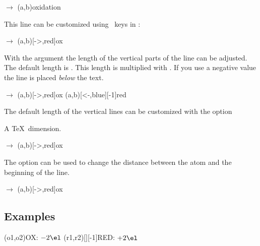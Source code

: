 \documentclass{chemmacros-manual}
\begin{document}
\begin{example}
  \vspace{7mm}
   $\rightarrow$ \pch\redox(a,b){oxidation}
\end{example}

This line can be customized using \TikZ\ keys in :
\begin{example}
  \vspace{7mm}
   $\rightarrow$ \pch\redox(a,b)[->,red]{ox}
\end{example}

With the argument  the length of the vertical parts of the line can
be adjusted.  The default length is \code{.6em}.  This length is multiplied
with .  If you use a negative value the line is placed \emph{below}
the text.
\begin{example}
  \vspace{7mm}
   $\rightarrow$ \pch
  \redox(a,b)[->,red]{ox}
  \redox(a,b)[<-,blue][-1]{red}
  \vspace{7mm}
\end{example}

The default length of the vertical lines can be customized with the option
\begin{options}
  \Default{.6em}
    A \TeX\ dimension.
\end{options}

\begin{example}
  \vspace{7mm}
   $\rightarrow$ \pch\redox(a,b)[->,red]{ox}
\end{example}

\begin{options}
  \Default{.2em}
    The option can be used to change the distance between the atom and the
    beginning of the line.
\end{options}

\begin{example}
  \vspace{7mm}
   $\rightarrow$ \pch\redox(a,b)[->,red]{ox}
\end{example}

\subsection{Examples}
\begin{example}
  \vspace{7mm}
  \redox(o1,o2){\small OX: $- 2\el$}
  \redox(r1,r2)[][-1]{\small RED: $+ 2\el$}
  \vspace{7mm}
\end{example}
\end{document}
